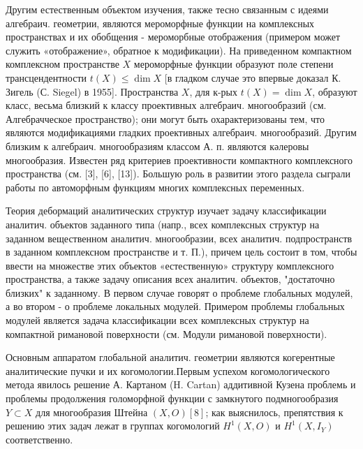 \documentclass[10pt]{article}
\begin{document}
Другим естественным объектом изучения, также тесно связанным с идеями алгебраич. геометрии, являются мероморфные функции на комплексных пространствах и их обобщения - мероморбные отображения (примером может служить «отображение», обратное к модификации). На приведенном компактном комплексном пространстве $X$ мероморфные функции образуют поле степени трансцендентности $t(X) \leqslant \operatorname{dim} X$ [в гладком случае это впервые доказал К. Зигель (С. Siegel) в 1955]. Пространства $X$, для к-рых $t(X)=\operatorname{dim} X$, образуют класс, весьма близкий к классу проективных алгебраич. многообразий (см. Алгебрачческое пространство); они могут быть охарактеризованы тем, что являются модификациями гладких проективных алгебраич. многообразий. Другим близким к алгебраич. многообразиям классом А. п. являются кәлеровы многообразия. Известен ряд критериев проективности компактного комплексного пространства (см. [3], [6], [13]). Большую роль в развитии этого раздела сыграли работы по автоморфным функциям многих комплексных переменных.



Теория дебормаций аналитических структур изучает задачу классификации аналитич. объектов заданного типа (напр., всех комплексных структур на заданном вещественном аналитич. многообразии, всех аналитич. подпространств в заданном комплексном пространстве и т. П.), причем цель состоит в том, чтобы ввести на множестве этих объектов «естественную» структуру комплексного пространства, а также задачу описания всех аналитич. объектов, "достаточно близких" к заданному. В первом случае говорят о проблеме глобальных модулей, а во втором - о проблеме локальных модулей. Примером проблемы глобальных модулей является задача классификации всех комплексных структур на компактной римановой поверхности (см. Модули римановой поверхности).



Основным аппаратом глобальной аналитич. геометрии являются когерентные аналитические пучки и их когомологии.Первым успехом когомологического метода явилось решение А. Картаном (H. Cartan) аддитивной Кузена проблемь и проблемы продолжения голоморфной функции с замкнутого подмногообразия $Y \subset X$ для многообразия Штейна $(X, O)[8]$; как выяснилось, препятствия к решению этих задач лежат в группах когомологий $H^{1}(X, O)$ и $H^{1}\left(X, I_{Y}\right)$ соответственно.
\end{document}
